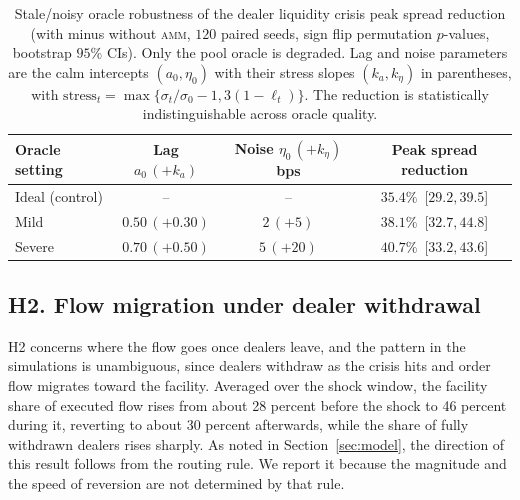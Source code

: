 \documentclass[a4paper,fleqn]{cas-sc}
\newcommand{\acro}[1]{\textsc{\MakeLowercase{#1}}\xspace}
\newcommand{\AMM}{\acro{AMM}}
\begin{document}
\begin{table}[h]
\centering
\footnotesize
\caption{Stale/noisy oracle robustness of the dealer liquidity crisis peak spread reduction (with minus without \AMM{}, $120$ paired seeds, sign flip permutation $p$-values, bootstrap $95$\% CIs). Only the pool oracle is degraded. Lag and noise parameters are the calm intercepts $(a_0,\eta_0)$ with their stress slopes $(k_a,k_\eta)$ in parentheses, with $\mathrm{stress}_t=\max\{\sigma_t/\sigma_0-1,3(1-\ell_t)\}$. The reduction is statistically indistinguishable across oracle quality.}
\label{tab:oracle}
\begin{tabular}{lccc}
\toprule
Oracle setting & Lag $a_0\,(+k_a)$ & Noise $\eta_0\,(+k_\eta)$ bps & Peak spread reduction \\
\midrule
Ideal (control) & --          & --        & $35.4\%$ \,[$29.2,39.5$] \\
Mild            & $0.50\,(+0.30)$ & $2\,(+5)$  & $38.1\%$ \,[$32.7,44.8$] \\
Severe          & $0.70\,(+0.50)$ & $5\,(+20)$ & $40.7\%$ \,[$33.2,43.6$] \\
\bottomrule
\end{tabular}
\end{table}

\subsection{H2. Flow migration under dealer withdrawal}

H2 concerns where the flow goes once dealers leave, and the pattern in the simulations is unambiguous, since dealers withdraw as the crisis hits and order flow migrates toward the facility. Averaged over the shock window, the facility share of executed flow rises from about 28 percent before the shock to 46 percent during it, reverting to about 30 percent afterwards, while the share of fully withdrawn dealers rises sharply. As noted in Section~\ref{sec:model}, the direction of this result follows from the routing rule. We report it because the magnitude and the speed of reversion are not determined by that rule.
\end{document}
